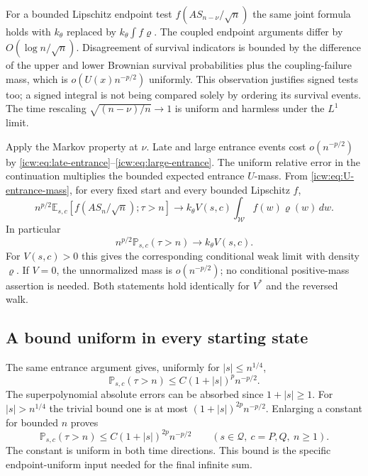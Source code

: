 \documentclass[11pt,letterpaper]{article}
\theoremstyle{remark}\newtheorem{remark}[theorem]{Remark}
\newcommand{\Prob}{\mathbb P}
\newcommand{\E}{\mathbb E}
\newcommand{\Qd}{\mathcal Q}
\newcommand{\1}{\mathbf1}
\newcommand{\Wedge}{\mathcal W}
\begin{document}
For a bounded Lipschitz endpoint test $f(AS_{n-\nu}/\sqrt n)$ the
same joint formula holds with $k_\theta$ replaced by
$k_\theta\int f\varrho$. The coupled endpoint arguments differ by
$O(\log n/\sqrt n)$. Disagreement of survival indicators is bounded
by the difference of the upper and lower Brownian survival probabilities
plus the coupling-failure mass, which is $o(U(x)n^{-p/2})$ uniformly.
This observation justifies signed tests too; a signed integral is not
being compared solely by ordering its survival events. The time rescaling
$\sqrt{(n-\nu)/n}\to1$ is uniform and harmless under the $L^1$ limit.

Apply the Markov property at $\nu$. Late and large entrance events cost
$o(n^{-p/2})$ by \eqref{icw:eq:late-entrance}--\eqref{icw:eq:large-entrance}.
The uniform relative error in the continuation multiplies the bounded
expected entrance $U$-mass. From \eqref{icw:eq:U-entrance-mass}, for every
fixed start and every bounded Lipschitz $f$,
\begin{equation}\label{icw:eq:meander-joint}
 n^{p/2}\E_{s,c}[f(AS_n/\sqrt n);\tau>n]
 \longrightarrow k_\theta V(s,c)\int_{\Wedge}f(w)\varrho(w)\,dw.
\end{equation}
In particular
\begin{equation}\label{icw:eq:sharp-survival}
 n^{p/2}\Prob_{s,c}(\tau>n)\longrightarrow k_\theta V(s,c).
\end{equation}
For $V(s,c)>0$ this gives the corresponding conditional weak limit
with density $\varrho$. If $V=0$, the unnormalized mass is
$o(n^{-p/2})$; no conditional positive-mass assertion is needed.
Both statements hold identically for $V^*$ and the reversed walk.

\subsection{A bound uniform in every starting state}
The same entrance argument gives, uniformly for $|s|\le n^{1/4}$,
\[
 \Prob_{s,c}(\tau>n)\le C(1+|s|)^p n^{-p/2}.
\]
The superpolynomial absolute errors can be absorbed since $1+|s|\ge1$.
For $|s|>n^{1/4}$ the trivial bound one is at most
$(1+|s|)^{2p}n^{-p/2}$. Enlarging a constant for bounded $n$ proves
\begin{equation}\label{icw:eq:global-survival}
 \Prob_{s,c}(\tau>n)\le C(1+|s|)^{2p}n^{-p/2}
 \qquad(s\in\Qd,\ c=P,Q,\ n\ge1).
\end{equation}
The constant is uniform in both time directions. This bound is the
specific endpoint-uniform input needed for the final infinite sum.
\end{document}
